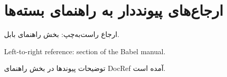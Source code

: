 \documentclass{article}
\begin{document}
\section*{ارجاع‌های پیونددار به راهنمای بسته‌ها}

ارجاع راست‌به‌چپ: بخش  راهنمای بابل.

\begin{otherlanguage}{english}
Left-to-right reference: section  of the Babel manual.
\end{otherlanguage}

توضیحات پیوندها در بخش  راهنمای
\foreignlanguage{english}{DocRef} آمده است.
\end{document}

